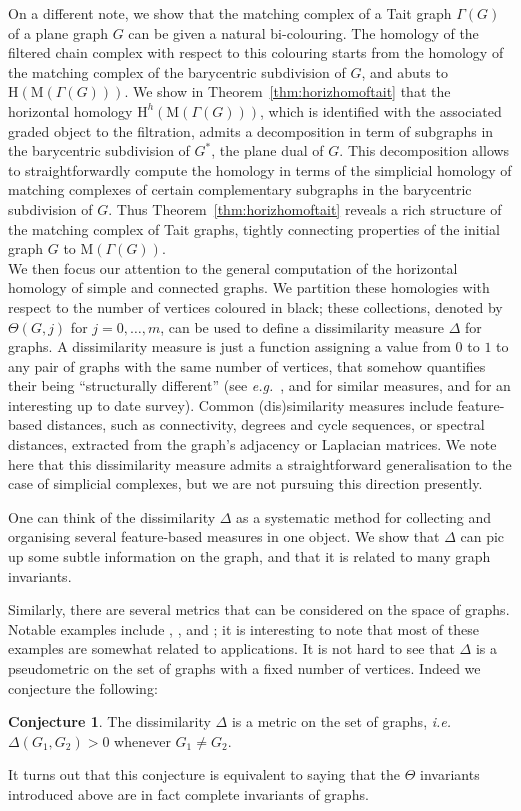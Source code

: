 \documentclass[11pt, a4paper, reqno, twoside, makeidx]{amsart}
\theoremstyle{remark}
\theoremstyle{plain}
\theoremstyle{definition}
\newtheorem*{cccc}{Conjecture}
\newcommand{\HH}{\mathrm{H}}
\newcommand{\Mat}{\mathrm{M}}
\begin{document}
On a different note, we show that the matching complex of a Tait graph $\Gamma(G)$ of a plane graph $G$ can be given a natural bi-colouring. The homology of the filtered chain complex with respect to this colouring starts from the homology of the matching complex of the barycentric subdivision of $G$, and abuts to $\HH (\Mat (\Gamma(G)))$. We show in Theorem~\ref{thm:horizhomoftait} that the horizontal homology $\HH^h(\Mat(\Gamma(G)))$, which is identified with the associated graded object to the filtration, admits a decomposition in term of subgraphs in the barycentric subdivision of $G^*$, the plane dual of $G$. This decomposition allows to straightforwardly compute the homology in terms of the simplicial homology of matching complexes of certain complementary subgraphs in  the barycentric subdivision of $G$. Thus Theorem~\ref{thm:horizhomoftait} reveals a rich structure of the matching complex of Tait graphs, tightly connecting properties of the initial graph $G$ to $\Mat(\Gamma(G))$.\\

We then focus our attention to the general computation of the horizontal homology of simple and connected graphs. We partition these homologies with respect to the number of vertices coloured in black; these collections, denoted by $\Theta(G,j)$ for $j = 0, \ldots, m$, can be used to define a dissimilarity measure $\Delta$ for graphs. 
A dissimilarity measure is just a function assigning a value from $0$ to $1$ to any pair of graphs with the same number of vertices, that somehow quantifies their being ``structurally different'' (see \emph{e.g.}~\cite{schieber2017quantification},\cite{chartrand1998graph} and \cite{li2018efficient}  for similar measures, and \cite{wills2020metrics} for an interesting up to date survey). Common (dis)similarity measures include feature-based distances, such as connectivity, degrees and cycle sequences, or spectral distances, extracted from the graph's adjacency or Laplacian matrices.
We note here that this dissimilarity measure admits a straightforward generalisation to the case of simplicial complexes, but we are not pursuing this direction presently.

One can think of the dissimilarity $\Delta$ as a systematic method for collecting and organising several feature-based measures in one object.
We show that $\Delta$ can pic up some subtle information on the graph, and that it is related to many graph invariants. 

Similarly, there are several metrics that can be considered on the space of graphs. Notable examples include \cite{balavz1986metric}, \cite{bhutani2003metric}, and \cite{bento2018family}; it is interesting to note that most of these examples are somewhat related to applications.
It is not hard to see that $\Delta$ is a pseudometric on the set of graphs with a fixed number of vertices. Indeed we conjecture the following:
\begin{cccc}
The dissimilarity $\Delta$ is a metric on the set of graphs, \emph{i.e.}~$\Delta(G_1,G_2) > 0$ whenever $G_1 \neq G_2$. 
\end{cccc}
It turns out that this conjecture is equivalent to saying that the $\Theta$ invariants introduced above are in fact complete invariants of graphs.
\end{document}
